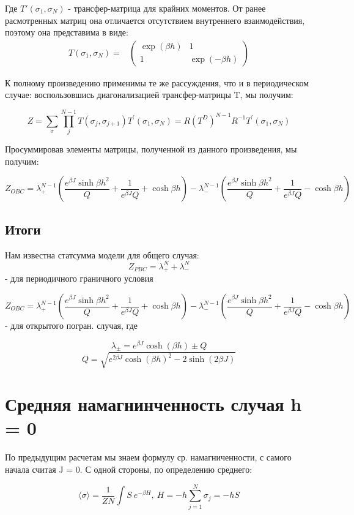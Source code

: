 \documentclass{article}
\newcommand{\bj}{\beta J}
\newcommand{\bh}{\beta h}
\newcommand{\lp}{\lambda_{+}}
\newcommand{\lm}{\lambda_{-}}
\newcommand{\pbc}{_{PBC}}
\newcommand{\obc}{_{OBC}}
\newcommand{\la}{\langle}
\newcommand{\ra}{\rangle}
\numberwithin{equation}{section}
\begin{document}
Где $T'(\sigma_{1}, \sigma_{N})$ - трансфер-матрица для крайних моментов. От ранее расмотренных матриц она отличается отсутствием внутреннего взаимодействия, поэтому она представима в виде:
\begin{align*}
  T(\sigma_{1}, \sigma_{N}) = &
  \begin{pmatrix}
    \exp{(\bh)} & 1 \\
    1 & \exp{(-\bh)}
  \end{pmatrix}  
\end{align*}

К полному произведению применимы те же рассуждения, что и в периодическом случае: воспользовшись диагонализацией трансфер-матрицы T, мы получим:

\[ Z = \sum_{\sigma}\prod_{j}^{N-1} T(\sigma_{j}, \sigma_{j+1})T^{'}(\sigma_{1}, \sigma_{N}) = R (T^{D})^{N-1} R^{-1} T^{'}(\sigma_{1}, \sigma_{N})\]

Просуммировав элементы матрицы, полученной из данного произведения, мы получим:

\begin{equation}\label{Zobc}
    Z\obc = \lp^{N-1}(\frac{e^{\bj} \sinh{\bh}^2}{Q} + \frac{1}{e^{\bj}Q} +  \cosh{\bh}) - \lm^{N-1}(\frac{e^{\bj} \sinh{\bh}^2}{Q} + \frac{1}{e^{\bj}Q} -  \cosh{\bh}) 
\end{equation}

\subsection{Итоги}
Нам известна статсумма модели для общего случая: 
\[ Z\pbc = \lambda_{+}^{N} + \lambda _{-} ^{N} \]
 - для периодичного граничного условия
 
\[ Z\obc = \lp^{N-1}(\frac{e^{\bj} \sinh{\bh}^2}{Q} + \frac{1}{e^{\bj}Q} +  \cosh{\bh}) - \lm^{N-1}(\frac{e^{\bj} \sinh{\bh}^2}{Q} + \frac{1}{e^{\bj}Q} -  \cosh{\bh}) \]
- для открытого погран. случая, где 

\[ \lambda_{\pm} = e^{\bj}  \cosh{(\bh)} \pm Q\]
\[ Q = \sqrt{e^{2\bj} \cosh{(\bh)}^{2} - 2 \sinh{(2\bj)}} \]

\section{Средняя намагнинченность случая h = 0}

По предыдущим расчетам мы знаем формулу ср. намагниченности, с самого начала считая J = 0. С одной стороны, по определению среднего:

\begin{equation}\label{MeanMagnJ01}
    \la\sigma\ra = \frac{1}{ZN} \int S\ e^{-\beta H},\  H = -h\sum_{j=1}^{N}\sigma_{j} = -h S
\end{equation}
\end{document}
